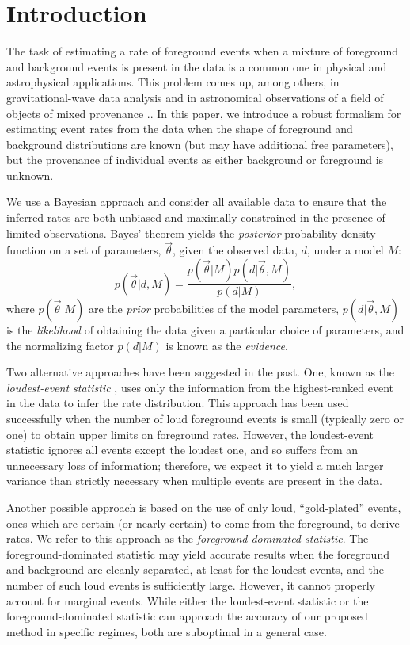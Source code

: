 \documentclass[aps,prd]{revtex4-1}
\begin{document}
\section{Introduction}

The task of estimating a rate of foreground events when a mixture of
foreground and background events is present in the data is a common
one in physical and astrophysical applications.  This problem comes
up, among others, in gravitational-wave data analysis
\cite[e.g.,][]{s5-highmass,s6-lowmass} and in astronomical
observations of a field of objects of mixed provenance \cite[GC
  cluster paper]{}..  In this paper, we introduce a robust formalism
for estimating event rates from the data when the shape of foreground
and background distributions are known (but may have additional free
parameters), but the provenance of individual events as either
background or foreground is unknown.

We use a Bayesian approach and consider all available data to ensure
that the inferred rates are both unbiased and maximally constrained in
the presence of limited observations.  Bayes' theorem yields the
\emph{posterior} probability density function on a set of parameters,
$\vec{\theta}$, given the observed data, $d$, under a model $M$:
\begin{equation}
p(\vec{\theta} | d, M) = \frac{p(\vec{\theta}|M)
  p(d|\vec{\theta},M)}{p(d|M)},
\end{equation}
where $p(\vec{\theta}|M)$ are the \emph{prior} probabilities of the
model parameters, $p(d|\vec{\theta},M)$ is the \emph{likelihood} of
obtaining the data given a particular choice of parameters, and the
normalizing factor $p(d|M)$ is known as the \emph{evidence}.

Two alternative approaches have been suggested in the past.  One,
known as the \emph{loudest-event statistic} \cite{Biswas2009}, uses
only the information from the highest-ranked event in the data to
infer the rate distribution.  This approach has been used successfully
\cite{s5-highmass,s6-lowmass} when the number of loud foreground
events is small (typically zero or one) to obtain upper limits on
foreground rates.  However, the loudest-event statistic ignores all
events except the loudest one, and so suffers from an unnecessary loss
of information; therefore, we expect it to yield a much larger
variance than strictly necessary when multiple events are present in
the data.

Another possible approach is based on the use of only loud,
``gold-plated'' events, ones which are certain (or nearly certain) to
come from the foreground, to derive rates.  We refer to this approach
as the \emph{foreground-dominated statistic}.  The
foreground-dominated statistic may yield accurate results when the
foreground and background are cleanly separated, at least for the
loudest events, and the number of such loud events is sufficiently
large.  However, it cannot properly account for marginal events.
While either the loudest-event statistic or the foreground-dominated
statistic can approach the accuracy of our proposed method in specific
regimes, both are suboptimal in a general case.
\end{document}
